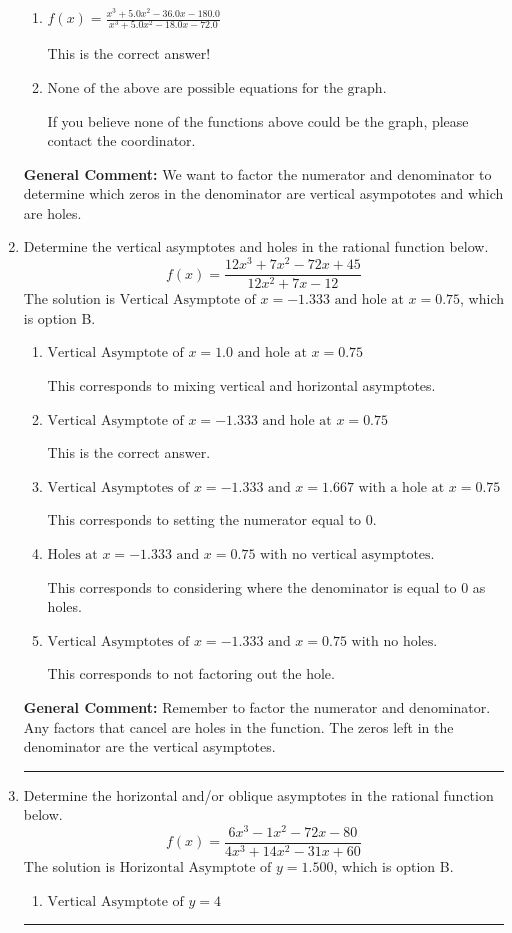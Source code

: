 \documentclass{extbook}[14pt]
\newcommand{\litem}[1]{\item #1

\rule{\textwidth}{0.4pt}}
\begin{document}
\begin{enumerate}
{\begin{enumerate}[label=\Alph*.]
You treated all of the zeros in the denominator as vertical asmptotes when some of them were holes and wrote factors as $x+z$.
\item \( f(x)=\frac{x^{3} +5.0 x^{2} -36.0 x -180.0}{x^{3} +5.0 x^{2} -18.0 x -72.0} \)

This is the correct answer!
\item \( \text{None of the above are possible equations for the graph.} \)

If you believe none of the functions above could be the graph, please contact the coordinator.
\end{enumerate}

\textbf{General Comment:} We want to factor the numerator and denominator to determine which zeros in the denominator are vertical asympototes and which are holes.
}
\litem{
Determine the vertical asymptotes and holes in the rational function below.
\[ f(x) = \frac{12x^{3} +7 x^{2} -72 x + 45}{12x^{2} +7 x -12} \]The solution is \( \text{Vertical Asymptote of } x = -1.333 \text{ and hole at } x = 0.75 \), which is option B.\begin{enumerate}[label=\Alph*.]
\item \( \text{Vertical Asymptote of } x = 1.0 \text{ and hole at } x = 0.75 \)

This corresponds to mixing vertical and horizontal asymptotes.
\item \( \text{Vertical Asymptote of } x = -1.333 \text{ and hole at } x = 0.75 \)

This is the correct answer.
\item \( \text{Vertical Asymptotes of } x = -1.333 \text{ and } x = 1.667 \text{ with a hole at } x = 0.75 \)

This corresponds to setting the numerator equal to 0.
\item \( \text{Holes at } x = -1.333 \text{ and } x = 0.75 \text{ with no vertical asymptotes.} \)

This corresponds to considering where the denominator is equal to 0 as holes.
\item \( \text{Vertical Asymptotes of } x = -1.333 \text{ and } x = 0.75 \text{ with no holes.} \)

This corresponds to not factoring out the hole.
\end{enumerate}

\textbf{General Comment:} Remember to factor the numerator and denominator. Any factors that cancel are holes in the function. The zeros left in the denominator are the vertical asymptotes.
}
\litem{
Determine the horizontal and/or oblique asymptotes in the rational function below.
\[ f(x) = \frac{6x^{3} -1 x^{2} -72 x -80}{4x^{3} +14 x^{2} -31 x + 60} \]The solution is \( \text{Horizontal Asymptote of } y = 1.500  \), which is option B.\begin{enumerate}[label=\Alph*.]
\item \( \text{Vertical Asymptote of } y = 4  \)


\end{enumerate}}
\end{enumerate}
\end{document}

